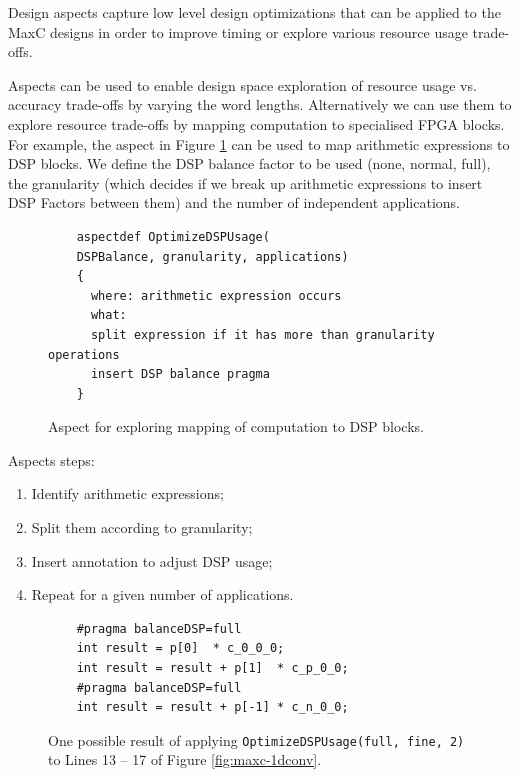 Design aspects capture low level design optimizations that can be
applied to the MaxC designs in order to improve timing or explore
various resource usage trade-offs.

Aspects can be used to enable design space exploration of resource
usage vs. accuracy trade-offs by varying the word
lengths. Alternatively we can use them to explore resource trade-offs
by mapping computation to specialised FPGA blocks. For example, the
aspect in Figure \ref{fig:aspect-DSP} can be used to map arithmetic
expressions to DSP blocks. We define the DSP balance factor to be used
(none, normal, full), the granularity (which decides if we break up
arithmetic expressions to insert DSP Factors between them) and the
number of independent applications.

\lstset{style=aspectp}
\begin{figure}[!h]
  \centering
  \begin{lstlisting}
    aspectdef OptimizeDSPUsage(
    DSPBalance, granularity, applications)
    {
      where: arithmetic expression occurs
      what:
      split expression if it has more than granularity operations
      insert DSP balance pragma
    }
  \end{lstlisting}
  \caption{Aspect for exploring mapping of computation to DSP blocks.}
  \label{fig:aspect-DSP}
\end{figure}

Aspects steps:

\begin{enumerate}
\item Identify arithmetic expressions;
\item Split them according to granularity;
\item Insert annotation to adjust DSP usage;
\item Repeat for a given number of applications.
\end{enumerate}

\newsavebox{\secondlisting}
\begin{lrbox}{\secondlisting}%
  
\end{lrbox}

\begin{figure}
  \begin{lstlisting}
    #pragma balanceDSP=full
    int result = p[0]  * c_0_0_0;
    int result = result + p[1]  * c_p_0_0;
    #pragma balanceDSP=full
    int result = result + p[-1] * c_n_0_0;
  \end{lstlisting}
  \caption{One possible result of applying
    \texttt{OptimizeDSPUsage(full, fine, 2)} to Lines 13 -- 17 of Figure
    \ref{fig:maxc-1dconv}.}
  \label{fig:maxc-1dconv-aspect}
\end{figure}


